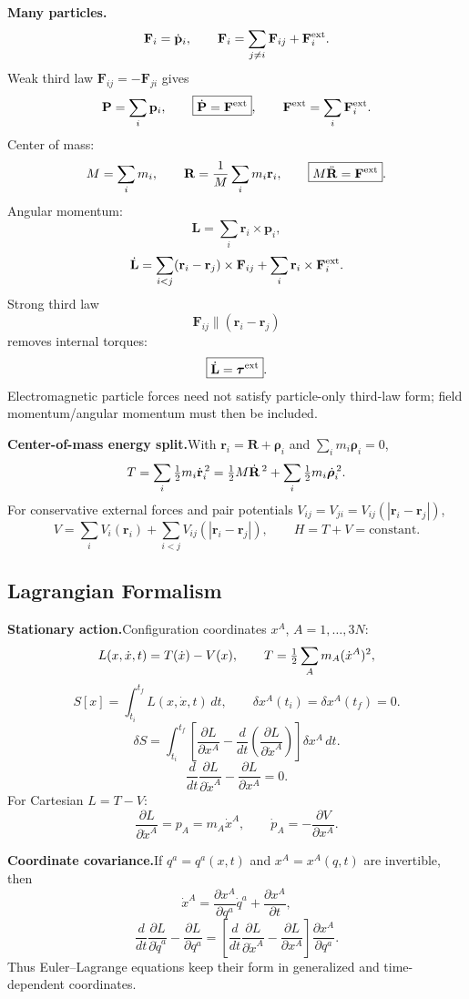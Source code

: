 \noindent\textbf{Many particles.}\quad
\[
\mathbf F_i=\dot{\mathbf p}_i,\qquad
\mathbf F_i=\sum_{j\ne i}\mathbf F_{ij}+\mathbf F_i^{\rm ext}.
\]
Weak third law $\mathbf F_{ij}=-\mathbf F_{ji}$ gives
\[
\mathbf P=\sum_i\mathbf p_i,\qquad
\boxed{\dot{\mathbf P}=\mathbf F^{\rm ext}},\qquad
\mathbf F^{\rm ext}=\sum_i\mathbf F_i^{\rm ext}.
\]
Center of mass:
\[
M=\sum_i m_i,\qquad
\mathbf R=\frac{1}{M}\sum_i m_i\mathbf r_i,\qquad
\boxed{M\ddot{\mathbf R}=\mathbf F^{\rm ext}}.
\]
Angular momentum:
\[
\mathbf L=\sum_i\mathbf r_i\times\mathbf p_i,
\]
\[
\dot{\mathbf L}
=\sum_{i<j}(\mathbf r_i-\mathbf r_j)\times\mathbf F_{ij}
+\sum_i\mathbf r_i\times\mathbf F_i^{\rm ext}.
\]
Strong third law
\[
\mathbf F_{ij}\parallel(\mathbf r_i-\mathbf r_j)
\]
removes internal torques:
\[
\boxed{\dot{\mathbf L}=\boldsymbol\tau^{\rm ext}}.
\]
Electromagnetic particle forces need not satisfy particle-only third-law form; field
momentum/angular momentum must then be included.

\noindent\textbf{Center-of-mass energy split.}\quad With
$\mathbf r_i=\mathbf R+\boldsymbol\rho_i$ and
$\sum_i m_i\boldsymbol\rho_i=0$,
\[
T=\sum_i\tfrac{1}{2} m_i\dot{\mathbf r}_i^{\,2}
=\tfrac{1}{2} M\dot{\mathbf R}^{\,2}
+\sum_i\tfrac{1}{2} m_i\dot{\boldsymbol\rho}_i^{\,2}.
\]
For conservative external forces and pair potentials
$V_{ij}=V_{ji}=V_{ij}(|\mathbf r_i-\mathbf r_j|)$,
\[
V=\sum_iV_i(\mathbf r_i)+\sum_{i<j}V_{ij}(|\mathbf r_i-\mathbf r_j|),
\qquad
\boxed{H=T+V=\text{constant}}.
\]

\subsection{Lagrangian Formalism}

\noindent\textbf{Stationary action.}\quad Configuration coordinates
$x^A$, $A=1,\ldots,3N$:
\[
L(x,\dot x,t)=T(\dot x)-V(x),\qquad
T=\tfrac{1}{2}\sum_A m_A(\dot x^A)^2,
\]
\[
S[x]=\int_{t_i}^{t_f}L(x,\dot x,t)\,dt,\qquad
\delta x^A(t_i)=\delta x^A(t_f)=0.
\]
\[
\delta S=\int_{t_i}^{t_f}
\left[
\frac{\partial L}{\partial x^A}
-\frac{d}{dt}\left(\frac{\partial L}{\partial\dot x^A}\right)
\right]\delta x^A\,dt.
\]
\[
\boxed{\frac{d}{dt}\frac{\partial L}{\partial\dot x^A}
-\frac{\partial L}{\partial x^A}=0}.
\]
For Cartesian $L=T-V$:
\[
\frac{\partial L}{\partial\dot x^A}=p_A=m_A\dot x^A,\qquad
\dot p_A=-\frac{\partial V}{\partial x^A}.
\]

\noindent\textbf{Coordinate covariance.}\quad If $q^a=q^a(x,t)$ and
$x^A=x^A(q,t)$ are invertible, then
\[
\dot x^A=\frac{\partial x^A}{\partial q^a}\dot q^a
+\frac{\partial x^A}{\partial t},
\]
\[
\boxed{
\frac{d}{dt}\frac{\partial L}{\partial\dot q^a}
-\frac{\partial L}{\partial q^a}
=
\left[
\frac{d}{dt}\frac{\partial L}{\partial\dot x^A}
-\frac{\partial L}{\partial x^A}
\right]\frac{\partial x^A}{\partial q^a}}.
\]
Thus Euler--Lagrange equations keep their form in generalized and time-dependent
coordinates.

